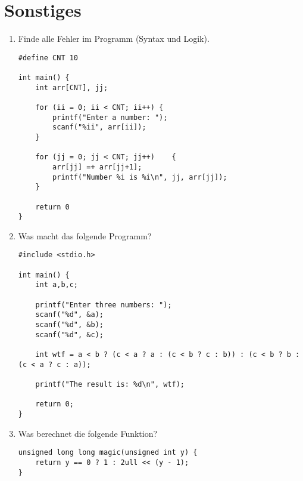\documentclass[]{scrartcl}
\begin{document}
\section{Sonstiges}
\begin{enumerate}[{1)}]
\item Finde alle Fehler im Programm (Syntax und Logik).
\begin{lstlisting}
#define CNT 10

int main() {
	int arr[CNT], jj;
	
	for (ii = 0; ii < CNT; ii++) {
		printf("Enter a number: ");
		scanf("%ii", arr[ii]);
	}

	for (jj = 0; jj < CNT; jj++)	{
		arr[jj] =+ arr[jj+1];
		printf("Number %i is %i\n", jj, arr[jj]);
	}

	return 0
}
\end{lstlisting}

\item Was macht das folgende Programm?
\begin{lstlisting}
#include <stdio.h>

int main() {
	int a,b,c;
	
	printf("Enter three numbers: ");
	scanf("%d", &a);
	scanf("%d", &b);
	scanf("%d", &c);
	
	int wtf = a < b ? (c < a ? a : (c < b ? c : b)) : (c < b ? b : (c < a ? c : a));
	
	printf("The result is: %d\n", wtf);
	
	return 0;
}
\end{lstlisting}

\item Was berechnet die folgende Funktion?
\begin{lstlisting}	
unsigned long long magic(unsigned int y) {
	return y == 0 ? 1 : 2ull << (y - 1);
}
\end{lstlisting}
\end{enumerate}
\end{document}
